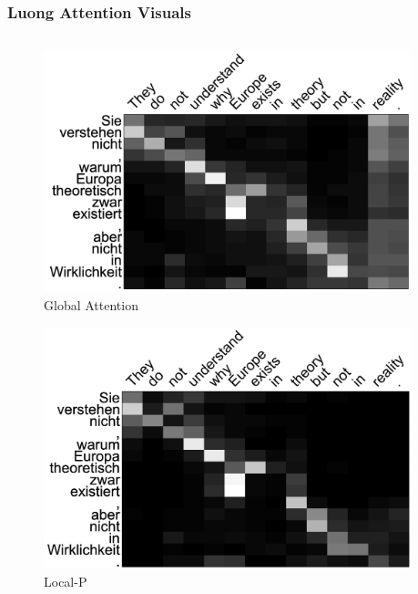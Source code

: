 \documentclass[usenames,dvipsnames]{beamer}
\begin{document}
\begin{frame}
  \frametitle{Luong Attention Visuals}
  \begin{columns}
    \begin{column}{0.45\textwidth}
      \vspace{-5mm}
    \begin{figure}
      \includegraphics[width=0.95\textwidth]{assets/global}
      \caption{Global Attention}
    \end{figure}
    \vspace{-7mm}
    \begin{figure}
      \includegraphics[width=0.95\textwidth]{assets/local_p}
      \caption{Local-P}
    \end{figure}
    \end{column}


\end{columns}
\end{frame}
\end{document}

